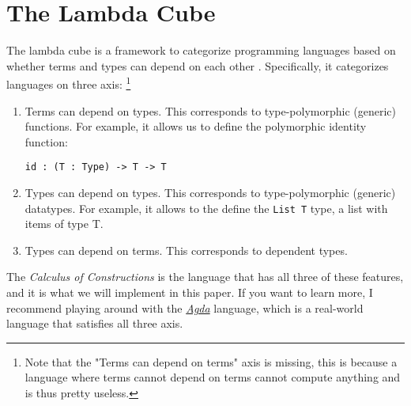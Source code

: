 \section{The Lambda Cube}

The lambda cube is a framework to categorize programming languages based on whether terms and types can depend on each other \cite{lambda_cube}. Specifically, it categorizes languages on three axis: \footnote{Note that the "Terms can depend on terms" axis is missing, this is because a language where terms cannot depend on terms cannot compute anything and is thus pretty useless.}

\begin{enumerate}
	\item Terms can depend on types. This corresponds to type-polymorphic (generic) functions. For example, it allows us to define the polymorphic identity function:
	\begin{lstlisting}
id : (T : Type) -> T -> T
	\end{lstlisting}
	\item Types can depend on types. This corresponds to type-polymorphic (generic) datatypes. For example, it allows to the define the \verb|List T| type, a list with items of type T.
	
	\item Types can depend on terms. This corresponds to dependent types.
\end{enumerate}

The \textit{Calculus of Constructions} is the language that has all three of these features, and it is what we will implement in this paper. If you want to learn more, I recommend playing around with the \textit{\href{https://agda.readthedocs.io/en/latest/}{Agda}} language, which is a real-world language that satisfies all three axis.
